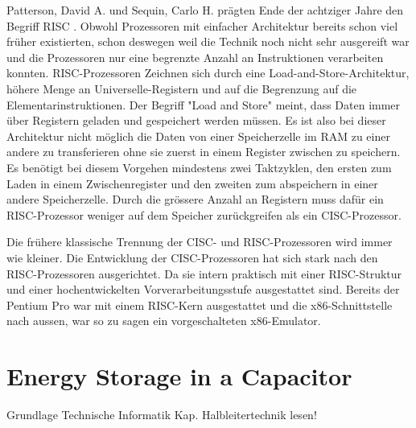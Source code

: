Patterson, David A. und Sequin, Carlo H. prägten Ende der achtziger Jahre den Begriff RISC \cite{Patterson:1981:RIR:800052.801895}. Obwohl Prozessoren mit einfacher Architektur bereits schon viel früher existierten, schon deswegen weil die Technik noch nicht sehr ausgereift war und die Prozessoren nur eine begrenzte Anzahl an Instruktionen verarbeiten konnten. RISC-Prozessoren Zeichnen sich durch eine Load-and-Store-Architektur, höhere Menge an Universelle-Registern und auf die Begrenzung auf die Elementarinstruktionen. Der Begriff "Load and Store" meint, dass Daten immer über Registern geladen und gespeichert werden müssen. Es ist also bei dieser Architektur nicht möglich die Daten von einer Speicherzelle im RAM zu einer andere zu transferieren ohne sie zuerst in einem Register zwischen zu speichern. Es benötigt bei diesem Vorgehen mindestens zwei Taktzyklen, den ersten zum Laden in einem Zwischenregister und den zweiten zum abspeichern in einer andere Speicherzelle. Durch die grössere Anzahl an Registern muss dafür ein RISC-Prozessor weniger auf dem Speicher zurückgreifen als ein CISC-Prozessor.
\par
Die frühere klassische Trennung der CISC- und RISC-Prozessoren wird immer wie kleiner. Die Entwicklung der CISC-Prozessoren hat sich stark nach den RISC-Prozessoren ausgerichtet. Da sie intern praktisch mit einer RISC-Struktur und einer hochentwickelten Vorverarbeitungsstufe ausgestattet sind. Bereits der Pentium Pro war mit einem RISC-Kern ausgestattet und die x86-Schnittstelle nach aussen, war so zu sagen ein vorgeschalteten x86-Emulator.







\section{Energy Storage in a Capacitor}


Grundlage Technische Informatik Kap. Halbleitertechnik lesen!









